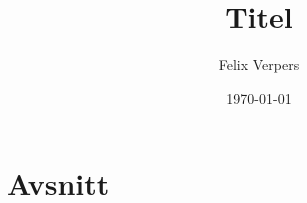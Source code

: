 \documentclass[]{article}
\begin{document}
\title{Titel}
\author{Felix Verpers}
\date{\today}
\maketitle
\section*{Avsnitt}



\end{document}
